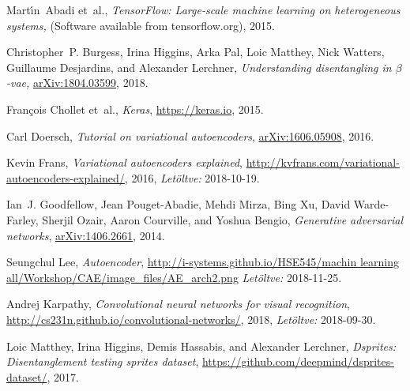 \begin{thebibliography}{99}

Mart\'{\i}n~Abadi et~al., \textit{{TensorFlow}: Large-scale machine learning on heterogeneous systems,} (Software available from tensorflow.org),  2015.

Christopher~P. Burgess, Irina Higgins, Arka Pal, Loic Matthey, Nick Watters,
  Guillaume Desjardins, and Alexander Lerchner, 
\textit{Understanding disentangling in $\beta$-vae,}
\url{arXiv:1804.03599}, 2018.

Fran\c{c}ois Chollet et~al.,
\newblock \textit{Keras},
\newblock \url{https://keras.io}, 2015.

Carl Doersch,
\newblock \textit{Tutorial on variational autoencoders},
\newblock \url{arXiv:1606.05908}, 2016.



Kevin Frans,
\newblock \textit{Variational autoencoders explained},
\newblock \url{http://kvfrans.com/variational-autoencoders-explained/}, 2016,
\newblock \textsl{Let\"oltve:} 2018-10-19.

Ian~J. Goodfellow, Jean Pouget-Abadie, Mehdi Mirza, Bing Xu, David
  Warde-Farley, Sherjil Ozair, Aaron Courville, and Yoshua Bengio,
\newblock \textit{Generative adversarial networks},
\newblock \url{arXiv:1406.2661}, 2014.

Seungchul Lee, \textit{Autoencoder},
\url{http://i-systems.github.io/HSE545/machin learning all/Workshop/CAE/image_files/AE_arch2.png} \newblock \textsl{Let\"oltve:} 2018-11-25.

Andrej Karpathy,
\newblock \textit{Convolutional neural networks for visual recognition},
\newblock \url{http://cs231n.github.io/convolutional-networks/}, 2018,
\newblock \textsl{Let\"oltve:} 2018-09-30.

Loic Matthey, Irina Higgins, Demis Hassabis, and Alexander Lerchner,
\newblock\textit{ Dsprites: Disentanglement testing sprites dataset},
\newblock \url{https://github.com/deepmind/dsprites-dataset/}, 2017.

\end{thebibliography}
